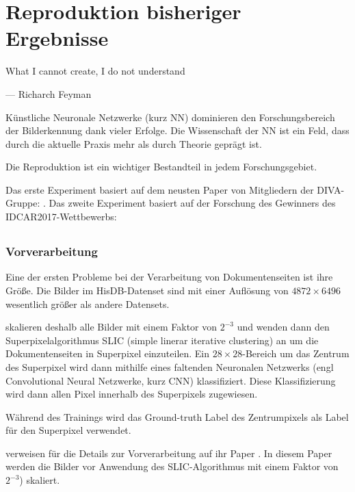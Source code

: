 \chapter{Reproduktion bisheriger Ergebnisse}
\label{chap:reproduktion}
\epigraph{What I cannot create, I do not understand}{--- Richarch Feyman}

Künstliche Neuronale Netzwerke (kurz NN) dominieren den Forschungsbereich der 
Bilderkennung dank vieler Erfolge. 
Die Wissenschaft der NN ist ein Feld, dass durch die aktuelle Praxis mehr als durch Theorie geprägt ist. 

Die Reproduktion ist ein wichtiger Bestandteil in jedem Forschungsgebiet. 


Das erste Experiment basiert auf dem neusten Paper von Mitgliedern der DIVA-Gruppe: \citeauthor*{ChenConvolutionalNeuralNetworks2017}. 
Das zweite Experiment basiert auf der Forschung des Gewinners des IDCAR2017-Wettbewerbs: \citeauthor*{XuPageSegmentationHistorical2017} 

\section{\cite{ChenConvolutionalNeuralNetworks2017}}

\subsection{Vorverarbeitung}
Eine der ersten Probleme bei der Verarbeitung von Dokumentenseiten ist ihre Größe.
Die Bilder im HisDB-Datenset sind mit einer Auflösung von \(4872 \times 6496\) wesentlich größer als andere Datensets.

\citeauthor{ChenConvolutionalNeuralNetworks2017} skalieren deshalb alle Bilder mit einem Faktor von  \(2^{-3}\) und wenden dann den Superpixelalgorithmus SLIC (simple linerar iterative clustering) an
\cite{AchantaSLICSuperpixels2010} um die Dokumentenseiten in Superpixel einzuteilen.
Ein \(28 \times 28\)-Bereich um das Zentrum des Superpixel wird dann mithilfe eines faltenden Neuronalen Netzwerks (engl Convolutional Neural Netzwerke, kurz CNN)
klassifiziert. Diese Klassifizierung wird dann allen Pixel innerhalb des Superpixels zugewiesen.

Während des Trainings wird das Ground-truth Label des Zentrumpixels als Label für den Superpixel verwendet.

\citeauthor{ChenConvolutionalNeuralNetworks2017} verweisen für die Details zur Vorverarbeitung 
auf ihr Paper \cite{ChenPageSegmentationHistorical2016}. 
In diesem Paper werden die Bilder vor Anwendung des SLIC-Algorithmus mit einem Faktor von \(2^{-3}\)) skaliert.


